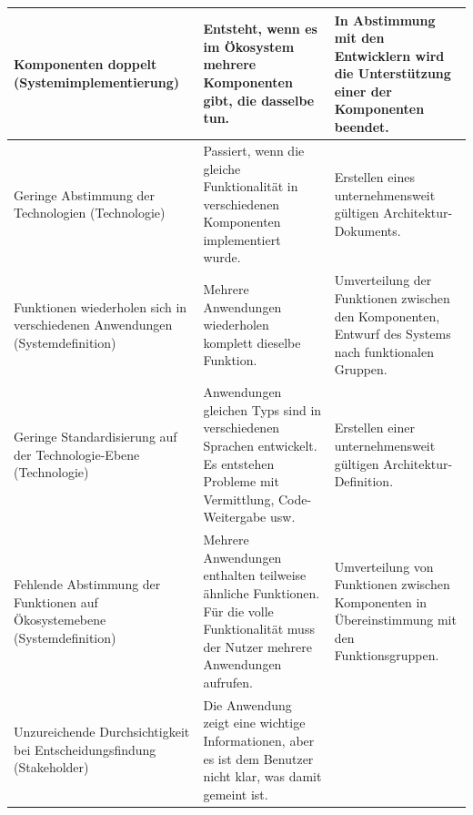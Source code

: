 \documentclass[11pt,a4paper]{article}
\begin{document}
\begin{center}\small
  \begin{tabular}{|p{}|p{}|p{}|}\hline 

    Komponenten doppelt (Systemimplementierung) &

    Entsteht, wenn es im Ökosystem mehrere Komponenten gibt, die dasselbe
    tun.&

    In Abstimmung mit den Entwicklern wird die Unterstützung einer der
    Komponenten beendet.\\\hline

    Geringe Abstimmung der Technologien (Technologie) &
    
    Passiert, wenn die gleiche Funktionalität in verschiedenen Komponenten
    implementiert wurde. &

    Erstellen eines unternehmensweit gültigen Architektur-Dokuments.\\\hline

    Funktionen wiederholen sich in verschiedenen Anwendungen
    (Systemdefinition) &
    
    Mehrere Anwendungen wiederholen komplett dieselbe Funktion. &

    Umverteilung der Funktionen zwischen den Komponenten, Entwurf des Systems
    nach funktionalen Gruppen.\\\hline

    Geringe Standardisierung auf der Technologie-Ebene (Technologie) &
    
    Anwendungen gleichen Typs sind in verschiedenen Sprachen entwickelt.  Es
    entstehen Probleme mit Vermittlung, Code-Weitergabe usw. &

    Erstellen einer unternehmensweit gültigen Architektur-Definition.\\\hline

    Fehlende Abstimmung der Funktionen auf Ökosystemebene (Systemdefinition) &

    Mehrere Anwendungen enthalten teilweise ähnliche Funktionen.  Für die volle
    Funktionalität muss der Nutzer mehrere Anwendungen aufrufen. &

    Umverteilung von Funktionen zwischen Komponenten in Übereinstimmung mit
    den Funktionsgruppen.\\\hline

    Unzureichende Durchsichtigkeit bei Entscheidungsfindung (Stakeholder) &

    Die Anwendung zeigt eine wichtige Informationen, aber es ist dem
    Benutzer nicht klar, was damit gemeint ist. &


\end{tabular}
\end{center}
\end{document}
